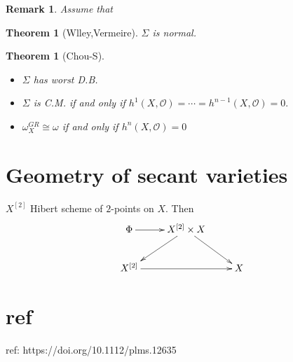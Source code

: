 \documentclass{article}
\newtheorem{theorem}[definition]{Theorem}
\newtheorem{remark}[definition]{Remark}
\begin{document}
\begin{remark}
  Assume that 
\end{remark}

\begin{theorem}[Wlley,Vermeire]
  $ \Sigma $ is normal.
\end{theorem}
\begin{theorem}[Chou-S]
  \begin{itemize}
    \item $ \Sigma $ has worst D.B.
    \item $ \Sigma $ is C.M.   if and only if $ h^{1}(X,\mathcal{O})=\cdots = h^{n-1}(X,\mathcal{O})=0. $
      \item $ \omega^{GR}_{X}\cong \omega  $   if and only if $ h^{n}(X,\mathcal{O})=0 $
  \end{itemize}
\end{theorem}
\section{Geometry of secant varieties}
$ X^{[2]} $ Hibert scheme of $ 2 $-points on $X$. Then
\[
  \xymatrix{
    \Phi\ar[r]& X^{[2]} \times X \ar[ld]\ar[rd] &\\
    X^{[2]}\ar[rr] & &X 
  } 
\]
\section{ref}
ref: https://doi.org/10.1112/plms.12635
\end{document}
